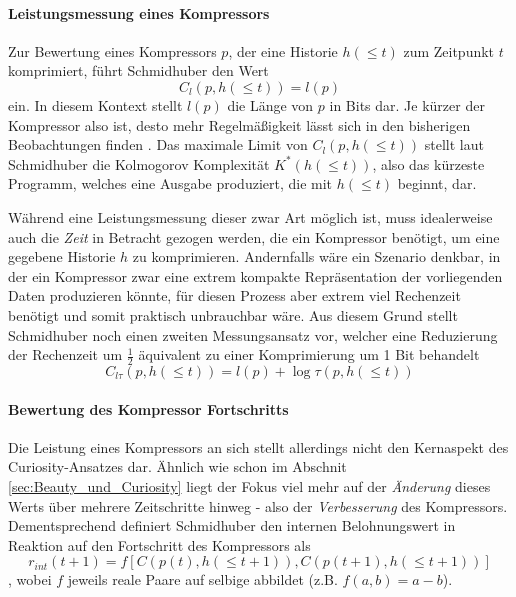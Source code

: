 \paragraph{Leistungsmessung eines Kompressors}
Zur Bewertung eines Kompressors \(p\), der eine Historie \(h(\leq t)\) zum Zeitpunkt \(t\) komprimiert, führt Schmidhuber den Wert 
\begin{equation}
  C_l(p,h(\leq t)) = l(p)  
\end{equation}
ein. In diesem Kontext stellt \(l(p)\) die Länge von \(p\) in Bits dar. Je kürzer der Kompressor also ist, desto mehr Regelmäßigkeit lässt sich in den bisherigen Beobachtungen finden \cite[p.~19]{curiosity_schmidhuber}.
Das maximale Limit von \(C_l(p,h(\leq t))\) stellt laut Schmidhuber die Kolmogorov Komplexität \(K^*(h(\leq t))\), also das kürzeste Programm, welches eine Ausgabe produziert, die mit \(h(\leq t)\) beginnt, dar.

Während eine Leistungsmessung dieser zwar Art möglich ist, muss idealerweise auch die \emph{Zeit} in Betracht gezogen werden, die ein Kompressor benötigt, um eine gegebene Historie \(h\) zu komprimieren. Andernfalls wäre ein Szenario denkbar, in der ein Kompressor zwar eine extrem kompakte Repräsentation der vorliegenden Daten produzieren könnte, für diesen Prozess aber extrem viel Rechenzeit benötigt und somit praktisch unbrauchbar wäre.
Aus diesem Grund stellt Schmidhuber noch einen zweiten Messungsansatz vor, welcher eine Reduzierung der Rechenzeit um \(\frac{1}{2}\) äquivalent zu einer Komprimierung um 1 Bit behandelt \cite[p.~19]{curiosity_schmidhuber}
\begin{equation}
  C_{l\tau}(p,h(\leq t)) = l(p) + \log \tau(p, h(\leq t))
\end{equation}


\paragraph{Bewertung des Kompressor Fortschritts}
Die Leistung eines Kompressors an sich stellt allerdings nicht den Kernaspekt des Curiosity-Ansatzes dar. Ähnlich wie schon im Abschnit \ref{sec:Beauty_und_Curiosity} liegt der Fokus viel mehr auf der \emph{Änderung} dieses Werts über mehrere Zeitschritte hinweg - also der \emph{Verbesserung} des Kompressors.
Dementsprechend definiert Schmidhuber den internen Belohnungswert in Reaktion auf den Fortschritt des Kompressors als 
\begin{equation}
  r_{int}(t+1) = f\left[C(p(t),h(\leq t+1)), C(p(t+1),h(\leq t+1))\right]  
\end{equation}
, wobei \(f\) jeweils reale Paare auf selbige abbildet (z.B. \(f(a,b) = a - b\)). \cite[p.~19]{curiosity_schmidhuber}



